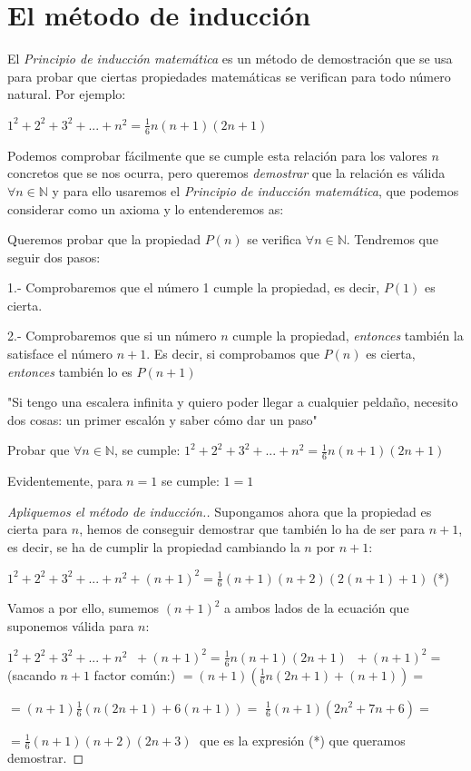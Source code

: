 \chapter{El método de inducción}
\label{inducción}

		
		El \emph{Principio de inducción matemática} es un método de demostración que se usa para probar que ciertas propiedades matemáticas se verifican para todo número natural. Por ejemplo:
		
		$1^2+2^2+3^2+...+n^2=\frac 1 6 n (n+1)(2n+1)$
		
		Podemos comprobar fácilmente que se cumple esta relación para los valores $n$ concretos que se nos ocurra, pero queremos \emph{demostrar} que la relación es válida $\forall n\in \mathbb N$ y para ello usaremos el \emph{Principio de inducción matemática}, que podemos considerar como un axioma y lo entenderemos as:
		
		\begin{axio} Queremos probar que la propiedad $P(n)$ se verifica $\forall n\in \mathbb N$. Tendremos que seguir dos pasos:
		
			
			1.-  Comprobaremos que el número 1 cumple la propiedad, es decir, $P(1)$ es cierta.
				
			2.- Comprobaremos que si un número $n$ cumple la propiedad, \emph{entonces} también la satisface el número $n+1$. Es decir, si comprobamos que $P(n)$ es cierta, \emph{entonces} también lo es $P(n+1)$
			
			
			"Si tengo una escalera infinita y quiero poder llegar a cualquier peldaño, necesito dos cosas: un primer escalón y saber cómo dar un paso"
		\end{axio}

		
		\begin{ejem} \label{sum-cuad-induc}
		Probar que $\forall n\in \mathbb N$, se cumple:
		$1^2+2^2+3^2+...+n^2=\frac 1 6 n (n+1)(2n+1)$	
		\end{ejem}
		 Evidentemente, para $n=1$ se cumple: $1=1$
		
		\begin{proof}[Apliquemos el método de inducción.]
			
		Supongamos ahora que la propiedad es cierta para $n$, hemos de conseguir demostrar que también lo ha de ser para $n+1$, es decir, se ha de cumplir la propiedad cambiando la $n$ por $n+1$:
		
		$1^2+2^2+3^2+...+n^2+(n+1)^2=\frac 1 6 (n+1) (n+2)(2(n+1)+1)$ (*)
		
		Vamos a por ello, sumemos $(n+1)^2$ a ambos lados de la ecuación que suponemos válida para $n$:
		
		
		$1^2+2^2+3^2+...+n^2\; \; +(n+1)^2=\frac 1 6 n (n+1)(2n+1)\; \; +(n+1)^2=$
		(sacando $n+1$ factor común:)
		$=(n+1) \left( \frac 1 6 n (2n+1) +(n+1) \right)=$
		
		$=(n+1)\frac 1 6 \left(  n (2n+1) + 6(n+1) \right)=$
		$\frac 1 6 (n+1) (2n^2+7n+6)=$
		
		$=\frac 1 6 (n+1) (n+2) (2n+3)\; $ que es la expresión (*) que queramos demostrar.%
		\end{proof}
		
